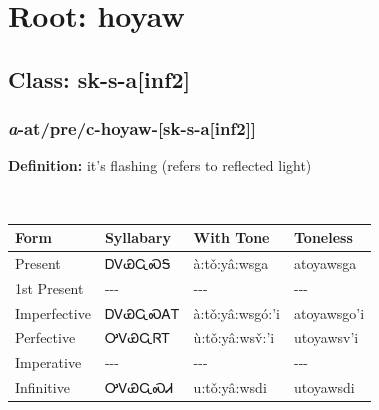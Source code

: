 \needspace{4in}
\section*{Root: hoyaw}
\nopagebreak
{}
\needspace{3in}
\subsection*{Class: sk-s-a[inf2]}
\nopagebreak
\needspace{2in}
\subsubsection*{\textit{a}{-}at/pre/c{-}\textbf{hoyaw}{-}[sk-s-a[inf2]]}
\nopagebreak
\textbf{Definition: } it{\textquoteright}s flashing (refers to reflected light)
\\[0.5em]
\begin{tabularx}{\textwidth}{l X X X}%
\toprule%
\textbf{Form}&\textbf{Syllabary}&\textbf{With Tone}&\textbf{Toneless}\\%
\midrule%
Present&ᎠᏙᏯᏩᏍᎦ&à:tǒ:yâ:wsga&atoyawsga\\%
1st Present&{-}{-}{-}&{-}{-}{-}&{-}{-}{-}\\%
Imperfective&ᎠᏙᏯᏩᏍᎪᎢ&à:tǒ:yâ:wsgó:’i&atoyawsgo’i\\%
Perfective&ᎤᏙᏯᏩᏒᎢ&ù:tǒ:yâ:wsv̌:’i&utoyawsv’i\\%
Imperative&{-}{-}{-}&{-}{-}{-}&{-}{-}{-}\\%
Infinitive&ᎤᏙᏯᏩᏍᏗ&u:tǒ:yâ:wsdi&utoyawsdi\\%
\bottomrule%
\end{tabularx}
\\[1em]